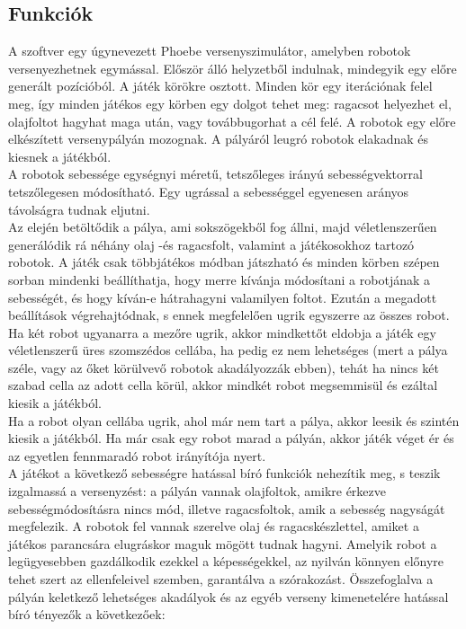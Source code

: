\subsection{Funkciók}

A szoftver egy úgynevezett Phoebe versenyszimulátor, amelyben robotok versenyezhetnek egymással. Először álló helyzetből indulnak, mindegyik egy előre generált pozícióból. A játék körökre osztott. Minden kör egy iterációnak felel meg, így minden játékos egy körben egy dolgot tehet meg: ragacsot helyezhet el, olajfoltot hagyhat maga után, vagy továbbugorhat a cél felé. A robotok egy előre elkészített versenypályán mozognak. A pályáról leugró robotok elakadnak és kiesnek a játékból.\\

A robotok sebessége egységnyi méretű, tetszőleges irányú sebességvektorral tetszőlegesen módosítható. Egy ugrással a sebességgel egyenesen arányos távolságra tudnak eljutni.\\

Az elején betöltődik a pálya, ami sokszögekből fog állni, majd véletlenszerűen generálódik rá néhány olaj -és ragacsfolt, valamint a játékosokhoz tartozó robotok. A játék csak többjátékos módban játszható és minden körben szépen sorban mindenki beállíthatja, hogy merre kívánja módosítani a robotjának a sebességét, és hogy kíván-e hátrahagyni valamilyen foltot. Ezután a megadott beállítások végrehajtódnak, s ennek megfelelően ugrik egyszerre az összes robot. Ha két robot ugyanarra a mezőre ugrik, akkor mindkettőt eldobja a játék egy véletlenszerű üres szomszédos cellába, ha pedig ez nem lehetséges (mert a pálya széle, vagy az őket körülvevő robotok akadályozzák ebben), tehát ha nincs két szabad cella az adott cella körül, akkor mindkét robot megsemmisül és ezáltal kiesik a játékból.\\

Ha a robot olyan cellába ugrik, ahol már nem tart a pálya, akkor leesik és szintén kiesik a játékból. Ha már csak egy robot marad a pályán, akkor játék véget ér és az egyetlen fennmaradó robot irányítója nyert.\\

A játékot a következő sebességre hatással bíró funkciók nehezítik meg, s teszik izgalmassá a versenyzést: a pályán vannak olajfoltok, amikre érkezve sebességmódosításra nincs mód, illetve ragacsfoltok, amik a sebesség nagyságát megfelezik. A robotok fel vannak szerelve olaj és ragacskészlettel, amiket a játékos parancsára elugráskor maguk mögött tudnak hagyni. Amelyik robot a legügyesebben gazdálkodik ezekkel a képességekkel, az nyilván könnyen előnyre tehet szert az ellenfeleivel szemben, garantálva a szórakozást. Összefoglalva a pályán keletkező lehetséges akadályok és az egyéb verseny kimenetelére hatással bíró tényezők a következőek:\\

